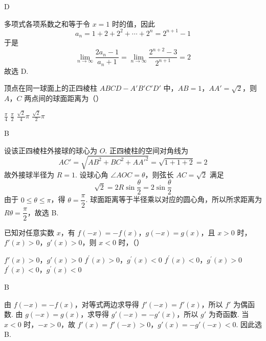 \begin{answer}
D
\end{answer}

\begin{solution}
多项式各项系数之和等于令 \(x=1\) 时的值，因此
\[
a_n=1+2+2^2+\cdots+2^n=2^{n+1}-1
\]
于是
\[
\lim_{n\to\infty}\frac{2a_n-1}{a_n+1}
 =\lim_{n\to\infty}\frac{2^{n+2}-3}{2^{n+1}}=2
\]
故选 D.
\end{solution}

\begin{problem}
顶点在同一球面上的正四棱柱 \(ABCD - A'B'C'D'\) 中，\(AB = 1\)，\(AA' = \sqrt{2}\)，则 \(A\)，\(C\) 两点间的球面距离为（\quad）

\choices
    {\( \frac{\pi}{4} \)}
    {\( \frac{\pi}{2} \)}
    {\( \frac{\sqrt{2}}{4}\pi \)}
    {\( \frac{\sqrt{2}}{2}\pi \)}
\end{problem}

\begin{answer}
B
\end{answer}

\begin{solution}
设该正四棱柱外接球的球心为 \(O\). 正四棱柱的空间对角线为
\[
AC'=\sqrt{AB^2+BC^2+AA'^2}=\sqrt{1+1+2}=2
\]
故外接球半径为 \(R=1\). 设球心角 \(\angle AOC=\theta\)，则弦长 \(AC=\sqrt2\) 满足
\[
\sqrt2=2R\sin\frac{\theta}{2}=2\sin\frac{\theta}{2}
\]
由于 \(0\leqslant\theta\leqslant\pi\)，得 \(\theta=\dfrac\pi2\). 球面距离等于半径乘以对应的圆心角，所以所求距离为 \(R\theta=\dfrac\pi2\)，故选 B.
\end{solution}

\begin{problem}
已知对任意实数 \(x\)，有 \(f(-x) = -f(x)\)，\(g(-x) = g(x)\)，且 \(x > 0\) 时，\(f'(x) > 0\)，\(g'(x) > 0\)，则 \(x < 0\) 时，（\quad）

\choices
    {\(f'(x) > 0\)，\(g'(x) > 0\)}
    {\(f^{\prime}(x) > 0\)，\(g^{\prime}(x) < 0\)}
    {\(f^{\prime}(x) < 0\)，\(g^{\prime}(x) > 0\)}
    {\(f^{\prime}(x) < 0\)，\(g^{\prime}(x) < 0\)}
\end{problem}

\begin{answer}
B
\end{answer}

\begin{solution}
由 \(f(-x)=-f(x)\)，对等式两边求导得 \(f'(-x)=f'(x)\)，所以 \(f'\) 为偶函数. 由 \(g(-x)=g(x)\)，求导得 \(g'(-x)=-g'(x)\)，所以 \(g'\) 为奇函数. 当 \(x<0\) 时，\(-x>0\)，故 \(f'(x)=f'(-x)>0\)，\(g'(x)=-g'(-x)<0\).
因此选 B.
\end{solution}


